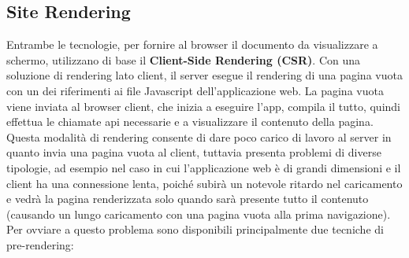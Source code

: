 \subsection{Site Rendering}
\label{sec:site-rendering}
Entrambe le tecnologie, per fornire al browser il documento da visualizzare a schermo, utilizzano di base il \textbf{Client-Side Rendering (CSR)}. Con una soluzione di rendering lato client, il server esegue il rendering di una pagina vuota con un dei riferimenti ai file Javascript dell'applicazione web. La pagina vuota viene inviata al browser client, che inizia a eseguire l'app, compila il tutto, quindi effettua le chiamate \gls{api} necessarie e a visualizzare il contenuto della pagina. \\
Questa modalità di rendering consente di dare poco carico di lavoro al server in quanto invia una pagina vuota al client, tuttavia presenta problemi di diverse tipologie, ad esempio nel caso in cui l'applicazione web è di grandi dimensioni e il client ha una connessione lenta, poiché subirà un notevole ritardo nel caricamento e vedrà la pagina renderizzata solo quando sarà presente tutto il contenuto (causando un lungo caricamento con una pagina vuota alla prima navigazione). \\
Per ovviare a questo problema sono disponibili principalmente due tecniche di pre-rendering:
